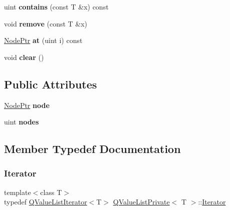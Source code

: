 \begin{DoxyCompactItemize}
uint {\bfseries contains} (const T \&x) const
\item 
\mbox{\label{class_q_value_list_private_aeec88498050bea418f0d2f35fa9e7f9f}} 
void {\bfseries remove} (const T \&x)
\item 
\mbox{\label{class_q_value_list_private_a7ab3a5eaedde2b62dcf9c227ddb9d3a2}} 
\mbox{\hyperlink{class_q_value_list_node}{Node\+Ptr}} {\bfseries at} (uint i) const
\item 
\mbox{\label{class_q_value_list_private_a4d3b3bceb36ae04887b37545929ddbdd}} 
void {\bfseries clear} ()
\end{DoxyCompactItemize}
\subsection*{Public Attributes}
\begin{DoxyCompactItemize}
\item 
\mbox{\label{class_q_value_list_private_a9ee977645abf7fa39646bf46208439fd}} 
\mbox{\hyperlink{class_q_value_list_node}{Node\+Ptr}} {\bfseries node}
\item 
\mbox{\label{class_q_value_list_private_a135ff8eff8b7a981761b17954c0a9b7a}} 
uint {\bfseries nodes}
\end{DoxyCompactItemize}


\subsection{Member Typedef Documentation}
\mbox{\label{class_q_value_list_private_aef9e14569c19defeaa2b6c8e636fafde}} 
\subsubsection{\texorpdfstring{Iterator}{Iterator}}
{\footnotesize\ttfamily template$<$class T$>$ \\
typedef \mbox{\hyperlink{class_q_value_list_iterator}{Q\+Value\+List\+Iterator}}$<$T$>$ \mbox{\hyperlink{class_q_value_list_private}{Q\+Value\+List\+Private}}$<$ T $>$\+::\mbox{\hyperlink{class_q_value_list_private_aef9e14569c19defeaa2b6c8e636fafde}{Iterator}}}

